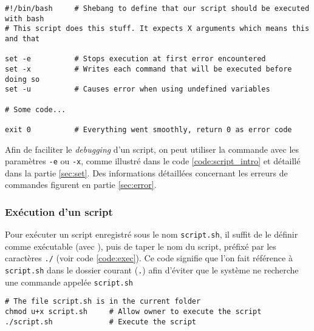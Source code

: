 \begin{code}
    \begin{verbatim}
#!/bin/bash     # Shebang to define that our script should be executed with bash
# This script does this stuff. It expects X arguments which means this and that

set -e          # Stops execution at first error encountered
set -x          # Writes each command that will be executed before doing so
set -u          # Causes error when using undefined variables

# Some code...

exit 0          # Everything went smoothly, return 0 as error code
    \end{verbatim}
    
    \vspace{-0.5cm}
    \label{code:script_intro}
\end{code}

Afin de faciliter le \textit{debugging} d'un script, on peut utiliser la commande  avec les paramètres \texttt{-e} ou \texttt{-x}, comme illustré dans le code \ref{code:script_intro} et détaillé dans la partie \ref{sec:set}. Des informations détaillées concernant les erreurs de commandes figurent en partie \ref{sec:error}.


\subsubsection{Exécution d'un script}
Pour exécuter un script enregistré sous le nom \texttt{script.sh}, il suffit de le définir comme exécutable (avec ), puis de taper le nom du script, préfixé par les caractères \texttt{./} (voir code \ref{code:exec}). Ce code signifie que l'on fait référence à \texttt{script.sh} dans le dossier courant (\texttt{.}) afin d'éviter que le système ne recherche une commande appelée \texttt{script.sh}

\begin{code}
    \begin{verbatim}
# The file script.sh is in the current folder
chmod u+x script.sh     # Allow owner to execute the script
./script.sh             # Execute the script
    \end{verbatim}
    
    \vspace{-0.5cm}
    \label{code:exec}
\end{code}

